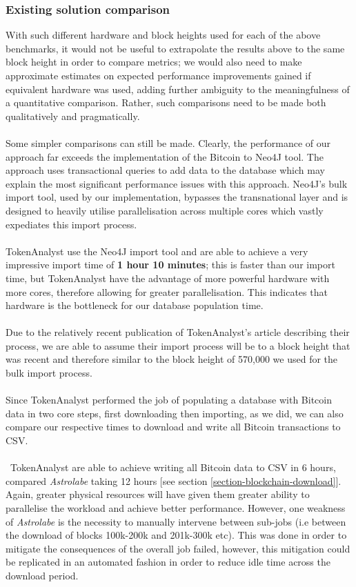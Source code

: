 \subsubsection{Existing solution comparison}
With such different hardware and block heights used for each of the above benchmarks, it would not be useful to extrapolate the results above to the same block height in order to compare metrics; we would also need to make approximate estimates on expected performance improvements gained if equivalent hardware was used, adding further ambiguity to the meaningfulness of a quantitative comparison. Rather, such comparisons need to be made both qualitatively and pragmatically.
\\\\
Some simpler comparisons can still be made. Clearly, the performance of our approach far exceeds the implementation of the Bitcoin to Neo4J tool. The approach uses transactional queries to add data to the database which may explain the most significant performance issues with this approach. Neo4J's bulk import tool, used by our implementation, bypasses the transnational layer and is designed to heavily utilise parallelisation across multiple cores which vastly expediates this import process. 
\\\\
TokenAnalyst use the Neo4J import tool and are able to achieve a very impressive import time of \textbf{1 hour 10 minutes}; this is faster than our import time, but TokenAnalyst have the advantage of more powerful hardware with more cores, therefore allowing for greater parallelisation. This indicates that hardware is the bottleneck for our database population time. 
\\\\
Due to the relatively recent publication of TokenAnalyst's article describing their process, we are able to assume their import process will be to a block height that was recent and therefore similar to the block height of 570,000 we used for the bulk import process.
\\\\
Since TokenAnalyst performed the job of populating a database with Bitcoin data in two core steps, first downloading then importing, as we did, we can also compare our respective times to download and write all Bitcoin transactions to CSV.
\\\\\
TokenAnalyst are able to achieve writing all Bitcoin data to CSV in 6 hours, compared \textit{Astrolabe} taking 12 hours [see section \ref{section-blockchain-download}]. Again, greater physical resources will have given them greater ability to parallelise the workload and achieve better performance. However, one weakness of \textit{Astrolabe} is the necessity to manually intervene between sub-jobs (i.e between the download of blocks 100k-200k and 201k-300k etc). This was done in order to mitigate the consequences of the overall job failed, however, this mitigation could be replicated in an automated fashion in order to reduce idle time across the download period. 

